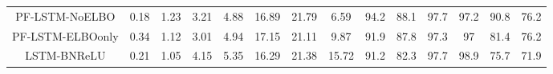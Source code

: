 \documentclass[letterpaper]{article} %
\begin{document}
\begin{table}[t]
\begin{tabular}{cccccccccccccc}
		PF-LSTM-NoELBO     & 0.18           & 1.23          & 3.21           & 4.88          & 16.89          & 21.79          & 6.59          & 94.2          & 88.1          & 97.7         & 97.2          & 90.8          & 76.2          \\
		PF-LSTM-ELBOonly   & 0.34           & 1.12          & 3.01           & 4.94          & 17.15          & 21.11          & 9.87          & 91.9          & 87.8          & 97.3         & 97            & 81.4          & 76.2          \\
		LSTM-BNReLU        & 0.21           & 1.05          & 4.15           & 5.35          & 16.29          & 21.38          & 15.72         & 91.2          & 82.3          & 97.7         & 98.9          & 75.7          & 71.9         \\
		\bottomrule
	\end{tabular}
\end{table}

\end{document}
